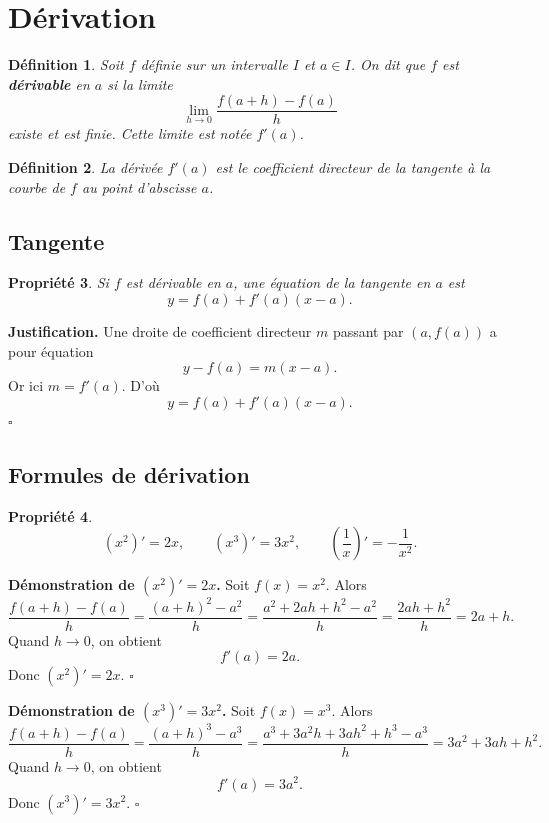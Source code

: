 \documentclass[11pt,a4paper]{article}
\newtheorem{definition}{Définition}[section]
\newtheorem{propriete}[definition]{Propriété}
\begin{document}
\section{Dérivation}

\begin{definition}
Soit \(f\) définie sur un intervalle \(I\) et \(a\in I\). On dit que \(f\) est \textbf{dérivable} en \(a\) si la limite
\[
\lim_{h\to 0}\frac{f(a+h)-f(a)}{h}
\]
existe et est finie. Cette limite est notée \(f'(a)\).
\end{definition}

\begin{definition}
La dérivée \(f'(a)\) est le coefficient directeur de la tangente à la courbe de \(f\) au point d'abscisse \(a\).
\end{definition}

\subsection{Tangente}

\begin{propriete}
Si \(f\) est dérivable en \(a\), une équation de la tangente en \(a\) est
\[
y=f(a)+f'(a)(x-a).
\]
\end{propriete}

\textbf{Justification.}  
Une droite de coefficient directeur \(m\) passant par \((a,f(a))\) a pour équation
\[
y-f(a)=m(x-a).
\]
Or ici \(m=f'(a)\). D'où
\[
y=f(a)+f'(a)(x-a).
\]
\(\square\)

\subsection{Formules de dérivation}

\begin{propriete}
\[
(x^2)'=2x,\qquad (x^3)'=3x^2,\qquad \left(\frac1x\right)'=-\frac1{x^2}.
\]
\end{propriete}

\textbf{Démonstration de \((x^2)'=2x\).}  
Soit \(f(x)=x^2\). Alors
\[
\frac{f(a+h)-f(a)}{h}=\frac{(a+h)^2-a^2}{h}
=\frac{a^2+2ah+h^2-a^2}{h}
=\frac{2ah+h^2}{h}=2a+h.
\]
Quand \(h\to 0\), on obtient
\[
f'(a)=2a.
\]
Donc \((x^2)'=2x\). \(\square\)

\textbf{Démonstration de \((x^3)'=3x^2\).}  
Soit \(f(x)=x^3\). Alors
\[
\frac{f(a+h)-f(a)}{h}
=\frac{(a+h)^3-a^3}{h}
=\frac{a^3+3a^2h+3ah^2+h^3-a^3}{h}
=3a^2+3ah+h^2.
\]
Quand \(h\to 0\), on obtient
\[
f'(a)=3a^2.
\]
Donc \((x^3)'=3x^2\). \(\square\)
\end{document}
